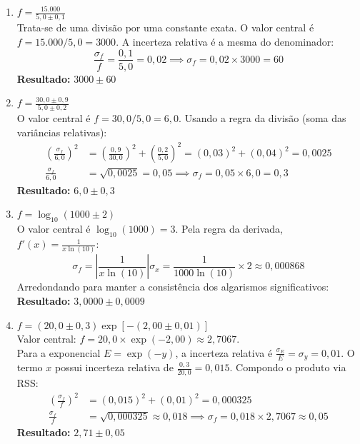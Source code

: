 \documentclass{article}
\begin{document}
\begin{enumerate}
    \item[(i)] $f = \frac{15.000}{5,0 \pm 0,1}$ \\
    Trata-se de uma divisão por uma constante exata. O valor central é $f = 15.000 / 5,0 = 3000$. A incerteza relativa é a mesma do denominador:
    \[ \frac{\sigma_f}{f} = \frac{0,1}{5,0} = 0,02 \implies \sigma_f = 0,02 \times 3000 = 60 \]
    \textbf{Resultado:} $3000 \pm 60$

    \item[(ii)] $f = \frac{30,0 \pm 0,9}{5,0 \pm 0,2}$ \\
    O valor central é $f = 30,0 / 5,0 = 6,0$. Usando a regra da divisão (soma das variâncias relativas):
    \begin{align*}
        \left(\frac{\sigma_f}{6,0}\right)^2 &= \left(\frac{0,9}{30,0}\right)^2 + \left(\frac{0,2}{5,0}\right)^2 = (0,03)^2 + (0,04)^2 = 0,0025 \\
        \frac{\sigma_f}{6,0} &= \sqrt{0,0025} = 0,05 \implies \sigma_f = 0,05 \times 6,0 = 0,3
    \end{align*}
    \textbf{Resultado:} $6,0 \pm 0,3$

    \item[(iii)] $f = \log_{10}(1000 \pm 2)$ \\
    O valor central é $\log_{10}(1000) = 3$. Pela regra da derivada, $f'(x) = \frac{1}{x \ln(10)}$:
    \[ \sigma_f = \left| \frac{1}{x \ln(10)} \right| \sigma_x = \frac{1}{1000 \ln(10)} \times 2 \approx 0,000868 \]
    Arredondando para manter a consistência dos algarismos significativos:
    \textbf{Resultado:} $3,0000 \pm 0,0009$

    \item[(iv)] $f = (20,0 \pm 0,3) \exp[-(2,00 \pm 0,01)]$ \\
    Valor central: $f = 20,0 \times \exp(-2,00) \approx 2,7067$. \\
    Para a exponencial $E = \exp(-y)$, a incerteza relativa é $\frac{\sigma_E}{E} = \sigma_y = 0,01$.
    O termo $x$ possui incerteza relativa de $\frac{0,3}{20,0} = 0,015$. Compondo o produto via RSS:
    \begin{align*}
        \left(\frac{\sigma_f}{f}\right)^2 &= (0,015)^2 + (0,01)^2 = 0,000325 \\
        \frac{\sigma_f}{f} &= \sqrt{0,000325} \approx 0,018 \implies \sigma_f = 0,018 \times 2,7067 \approx 0,05
    \end{align*}
    \textbf{Resultado:} $2,71 \pm 0,05$
\end{enumerate}
\end{document}
